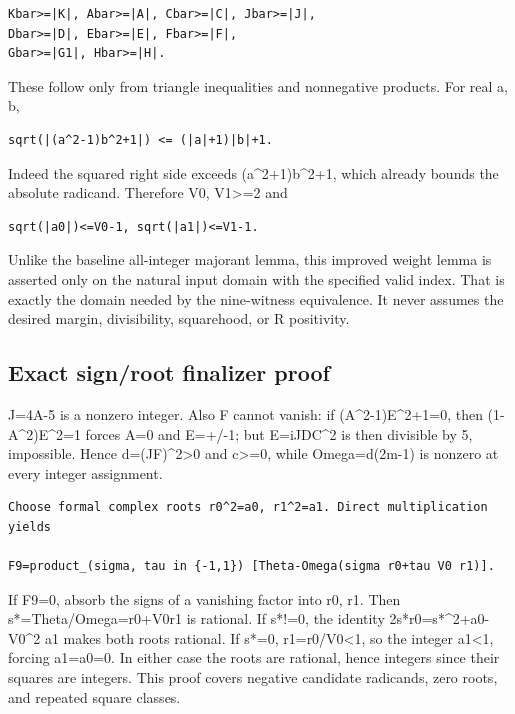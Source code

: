 \documentclass[
  10pt,
]{article}
\begin{document}
\begin{verbatim}
Kbar>=|K|, Abar>=|A|, Cbar>=|C|, Jbar>=|J|,
Dbar>=|D|, Ebar>=|E|, Fbar>=|F|,
Gbar>=|G1|, Hbar>=|H|.
\end{verbatim}

These follow only from triangle inequalities and nonnegative products.
For real a, b,

\begin{verbatim}
sqrt(|(a^2-1)b^2+1|) <= (|a|+1)|b|+1.
\end{verbatim}

Indeed the squared right side exceeds (a\^{}2+1)b\^{}2+1, which already
bounds the absolute radicand. Therefore V0, V1\textgreater=2 and

\begin{verbatim}
sqrt(|a0|)<=V0-1, sqrt(|a1|)<=V1-1.
\end{verbatim}

Unlike the baseline all-integer majorant lemma, this improved weight
lemma is asserted only on the natural input domain with the specified
valid index. That is exactly the domain needed by the nine-witness
equivalence. It never assumes the desired margin, divisibility,
squarehood, or R positivity.

\subsection{Exact sign/root finalizer
proof}\label{exact-signroot-finalizer-proof}

J=4A-5 is a nonzero integer. Also F cannot vanish: if
(A\^{}2-1)E\^{}2+1=0, then (1-A\^{}2)E\^{}2=1 forces A=0 and E=+/-1; but
E=iJDC\^{}2 is then divisible by 5, impossible. Hence
d=(JF)\^{}2\textgreater0 and c\textgreater=0, while Omega=d(2m-1) is
nonzero at every integer assignment.

\begin{verbatim}
Choose formal complex roots r0^2=a0, r1^2=a1. Direct multiplication yields

F9=product_(sigma, tau in {-1,1}) [Theta-Omega(sigma r0+tau V0 r1)].
\end{verbatim}

If F9=0, absorb the signs of a vanishing factor into r0, r1. Then
s*=Theta/Omega=r0+V0r1 is rational. If s*!=0, the identity
2s*r0=s*\^{}2+a0-V0\^{}2 a1 makes both roots rational. If s*=0,
\textbar r1\textbar=\textbar r0\textbar/V0\textless1, so the integer
\textbar a1\textbar\textless1, forcing a1=a0=0. In either case the roots
are rational, hence integers since their squares are integers. This
proof covers negative candidate radicands, zero roots, and repeated
square classes.
\end{document}
